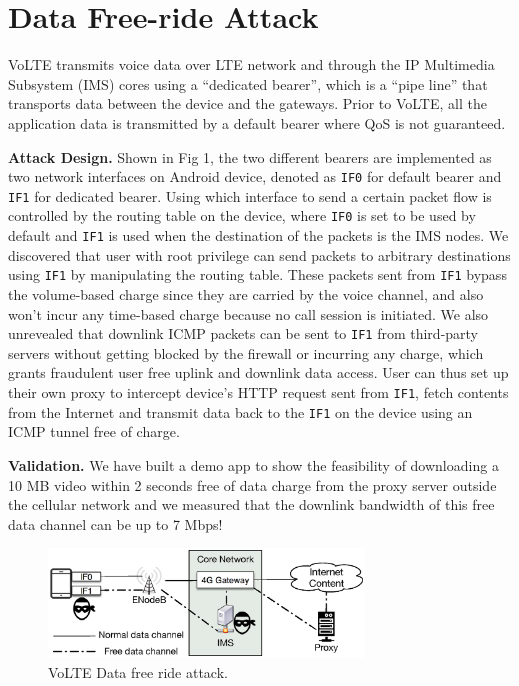 \section{Data Free-ride Attack}
\label{sec:intro}
VoLTE transmits voice data over LTE network and through the IP Multimedia Subsystem (IMS) cores using a ``dedicated bearer'', which is a ``pipe line'' that transports data between the device and the gateways. Prior to VoLTE, all the application data is transmitted by a default bearer where QoS is not guaranteed.

\textbf{Attack Design. }Shown in Fig 1, the two different bearers are implemented as two network interfaces on Android device, denoted as \texttt{IF0} for default bearer and \texttt{IF1} for dedicated bearer. Using which interface to send a certain packet flow is controlled by the routing table on the device, where \texttt{IF0} is set to be used by default and \texttt{IF1} is used when the destination of the packets is the IMS nodes. We discovered that user with root privilege can send packets to arbitrary destinations using \texttt{IF1} by manipulating the routing table. These packets sent from \texttt{IF1} bypass the volume-based charge since they are carried by the voice channel, and also won't incur any time-based charge because no call session is initiated. We also unrevealed that downlink ICMP packets can be sent to \texttt{IF1} from third-party servers without getting blocked by the firewall or incurring any charge, which grants fraudulent user free uplink and downlink data access. User can thus set up their own proxy to intercept device's HTTP request sent from \texttt{IF1}, fetch contents from the Internet and transmit data back to the \texttt{IF1} on the device using an ICMP tunnel free of charge. 

\textbf{Validation. }We have built a demo app to show the feasibility of downloading a 10 MB video within 2 seconds free of data charge from the proxy server outside the cellular network and we measured that the downlink bandwidth of this free data channel can be up to 7 Mbps! 

\begin{figure}[!t]
\hspace{-0.2in}
\centering
\includegraphics[width=3.3in]{figs/poster.eps}
\caption{VoLTE Data free ride attack.}
\vspace{-0.1in}
\label{fig:attack}
\end{figure}
